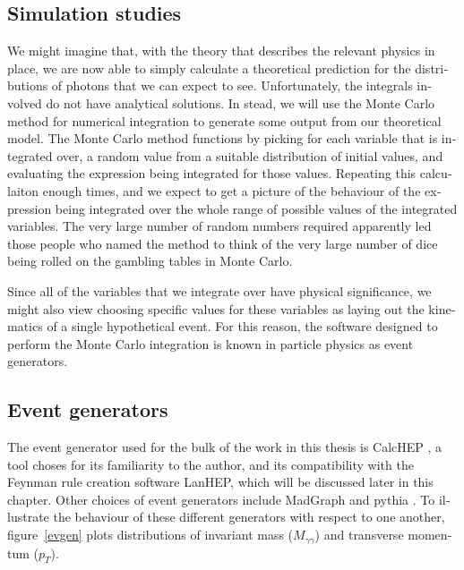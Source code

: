 

\begin{english}

\chapter{Simulation studies}

We might imagine that, with the theory that describes the relevant physics in place, we are now able to simply calculate a theoretical prediction for the distributions of photons that we can expect to see. Unfortunately, the integrals involved do not have analytical solutions. In stead, we will use the Monte Carlo method for numerical integration to generate some output from our theoretical model. The Monte Carlo method functions by picking for each variable that is integrated over, a random value from a suitable distribution of initial values, and evaluating the expression being integrated for those values. Repeating this calculaiton enough times, and we expect to get a picture of the behaviour of the expression being integrated over the whole range of possible values of the integrated variables. The very large number of random numbers required apparently led those people who named the method to think of the very large number of dice being rolled on the gambling tables in Monte Carlo.

Since all of the variables that we integrate over have physical significance, we might also view choosing specific values for these variables as laying out the kinematics of a single hypothetical event. For this reason, the software designed to perform the Monte Carlo integration is known in particle physics as event generators.

\section{Event generators}

The event generator used for the bulk of the work in this thesis is CalcHEP \cite{calchep}, a tool choses for its familiarity to the author, and its compatibility with the Feynman rule creation software LanHEP, which will be discussed later in this chapter. Other choices of event generators include MadGraph \cite{madgraph5} and pythia \cite{pythia}. To illustrate the behaviour of these different generators with respect to one another, figure~\ref{evgen} plots distributions of invariant mass ($M_{\gamma\gamma}$) and transverse momentum ($p_T$).


\end{english}

